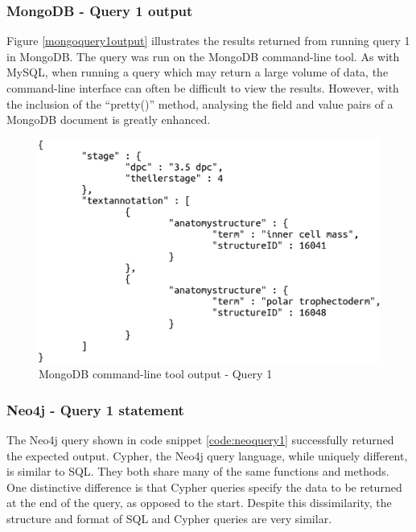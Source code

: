 \subsubsection*{MongoDB - Query 1 output}\label{mongoquery1output}
Figure \ref{mongoquery1output} illustrates the results returned from running query 1 in MongoDB. The query was run on the MongoDB command-line tool. As with MySQL, when running a query which may return a large volume of data, the command-line interface can often be difficult to view the results. However, with the inclusion of the ``pretty()'' method, analysing the field and value pairs of a MongoDB document is greatly enhanced.
\begin{figure}[H]\begin{center}\includegraphics[width=1\linewidth]{images/mongoquery1}\caption{MongoDB command-line tool output - Query 1}\label{fig:mongoquery1}\end{center}\end{figure}

\subsubsection*{Neo4j - Query 1 statement}\label{neoquery1statement}
The Neo4j query shown in code snippet \ref{code:neoquery1} successfully returned the expected output. Cypher, the Neo4j query language, while uniquely different, is similar to SQL. They both share many of the same functions and methods. One distinctive difference is that Cypher queries specify the data to be returned at the end of the query, as opposed to the start. Despite this dissimilarity, the structure and format of SQL and Cypher queries are very similar.

